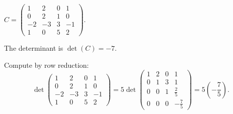 \documentclass{ximera}
\begin{document}
\begin{exercise} \label{c10.1.5b}
$C = \left(\begin{array}{rrrr} 1 & 2 & 0 & 1 \\ 0 & 2 & 1 & 0 \\
-2 & -3 & 3 & -1 \\ 1 & 0 & 5 & 2 \end{array}\right)$.

\begin{solution}

\ans The determinant is $\det(C) = -7$.

\soln Compute by row reduction:
\[
\det\left(\begin{array}{rrrr}
1 & 2 & 0 & 1 \\
0 & 2 & 1 & 0 \\
-2 & -3 & 3 & -1 \\
1 & 0 & 5 & 2 \end{array}\right)
= 5\det\left(\begin{array}{rrrr}
1 & 2 & 0 & 1 \\
0 & 1 & 3 & 1 \\
0 & 0 & 1 & \frac{2}{5} \\
0 & 0 & 0 & -\frac{7}{5} \end{array}\right)
= 5\left(-\frac{7}{5}\right).
\]

\end{solution}
\end{exercise}
\end{document}
